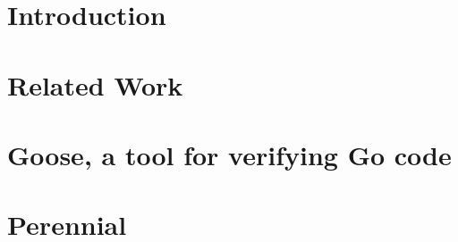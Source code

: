 \documentclass[11pt,twoside,final]{mitthesis}
\begin{document}




\begin{abstractpage}

\end{abstractpage}
\cleardoublepage


%

\tableofcontents
\listoffigures


\chapter{Introduction}%
\label{sec:introduction}


\chapter{Related Work}%
\label{sec:related}


\chapter{Goose, a tool for verifying Go code}%
\label{sec:goose}


\chapter{Perennial}%
\label{sec:perennial}

\end{document}

